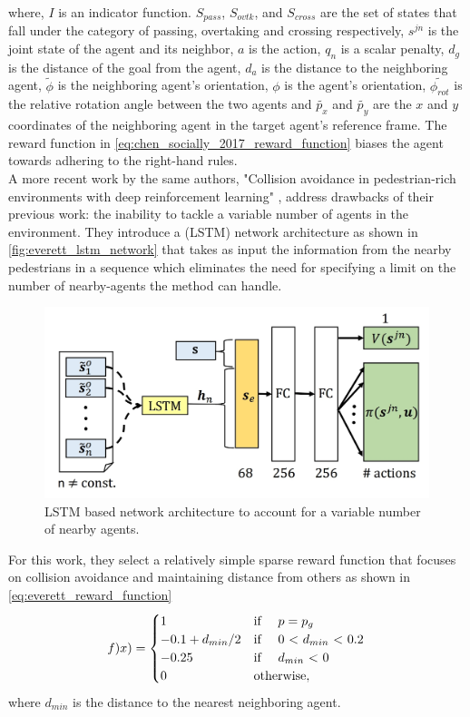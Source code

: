 where, $I$ is an indicator function. $S_{pass}$, $S_{ovtk}$, and $S_{cross}$ are the set of states that fall under the category of passing, overtaking and crossing respectively, $s^{jn}$ is the joint state of the agent and its neighbor, $a$ is the action, $q_{n}$ is a scalar penalty, $d_{g}$ is the distance of the goal from the agent, $d_{a}$ is the distance to the neighboring agent, $\tilde{\phi}$ is the neighboring agent's orientation, $\phi$ is the agent's orientation, $\tilde{\phi_{rot}}$ is the relative rotation angle between the two agents and $\tilde{p_x}$ and $\tilde{p_y}$ are the $x$ and $y$ coordinates of the neighboring agent in the target agent's reference frame. The reward function in \autoref{eq:chen_socially_2017_reward_function} biases the agent towards adhering to the right-hand rules.
\\

A more recent work by the same authors, "Collision avoidance in pedestrian-rich environments with deep reinforcement learning" \cite{everett_collision_2019}, 
address drawbacks of their previous work: the inability to tackle a variable number of agents in the environment. They introduce a  (LSTM) \cite{hochreiterLongShortTermMemory1997} network architecture as shown in \autoref{fig:everett_lstm_network} that takes as input the information from the nearby pedestrians in a sequence which eliminates the need for specifying a limit on the number of nearby-agents the method can handle.
\begin{figure}[!htbp]
	\centering
	\includegraphics[width=0.6\linewidth]{figures/everett}
	\caption{LSTM based network architecture to account for a variable number of nearby agents.}
	\label{fig:everett_lstm_network}
\end{figure}
 For this work, they select a relatively simple sparse reward function that focuses on collision avoidance and maintaining distance from others as shown in \autoref{eq:everett_reward_function}\\
\begin{align}
\label{eq:everett_reward_function}
f)x) = 
\begin{cases}
	 1 & \text{if \quad $p=p_g$} \\
	 -0.1+d_{min}/2 & \text{if \quad 0 < $d_{min}$ < 0.2} \\
	 -0.25 & \text{if \quad $d_{min}$ < 0}\\
	 0 & \text{otherwise}, 
\end{cases}
\end{align}
where $d_{min}$ is the distance to the nearest neighboring agent.
